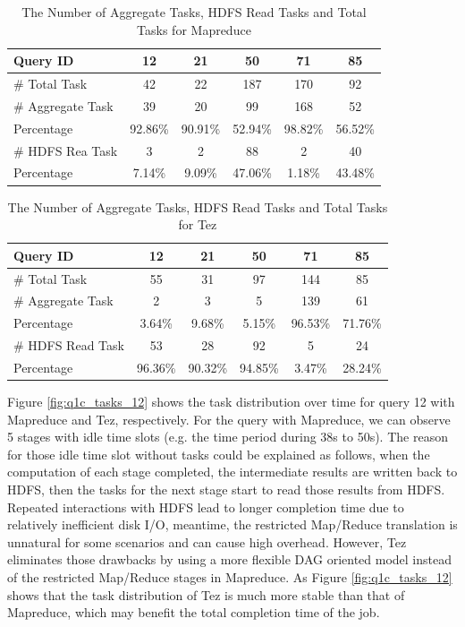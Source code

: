 \documentclass[10pt]{article}
\begin{document}
\begin{table}[htbp]
  \centering
  \caption{The Number of Aggregate Tasks, HDFS Read Tasks and Total Tasks for Mapreduce}
    \begin{tabular}{lccccc}
    \toprule
    Query ID & 12    & 21    & 50    & 71    & 85 \\
    \midrule
    \# Total Task & 42    & 22    & 187   & 170   & 92 \\
    \# Aggregate Task & 39    & 20    & 99    & 168   & 52 \\
    Percentage & 92.86\% & 90.91\% & 52.94\% & 98.82\% & 56.52\% \\
    \# HDFS Rea Task & 3     & 2     & 88    & 2     & 40 \\
    Percentage & 7.14\% & 9.09\% & 47.06\% & 1.18\% & 43.48\% \\
    \bottomrule
    \end{tabular}%
  \label{tab:mr_agg_task}%
\end{table}%

\begin{table}[htbp]
  \centering
  \caption{The Number of Aggregate Tasks, HDFS Read Tasks and Total Tasks for Tez}
    \begin{tabular}{lccccc}
    \toprule
    Query ID & 12    & 21    & 50    & 71    & 85 \\
    \midrule
    \# Total Task & 55    & 31    & 97    & 144   & 85 \\
    \# Aggregate Task & 2     & 3     & 5     & 139   & 61 \\
    Percentage & 3.64\% & 9.68\% & 5.15\% & 96.53\% & 71.76\% \\
    \# HDFS Read Task & 53    & 28    & 92    & 5     & 24 \\
    Percentage & 96.36\% & 90.32\% & 94.85\% & 3.47\% & 28.24\% \\

    \bottomrule
    \end{tabular}%
  \label{tab:tez_agg_task}%
\end{table}%


Figure \ref{fig:q1c_tasks_12} shows the task distribution over time for query 12 with Mapreduce and Tez, respectively. For the query with Mapreduce, we can observe 5 stages with idle time slots (e.g. the time period during 38s to 50s). The reason for those idle time slot without tasks could be explained as follows, when the computation of each stage completed, the intermediate results are written back to HDFS, then the tasks for the next stage start to read those results from HDFS. Repeated interactions with HDFS lead to longer completion time due to relatively inefficient disk I/O, meantime, the restricted Map/Reduce translation is unnatural for some scenarios and can cause high overhead. However, Tez eliminates those drawbacks by using a more flexible DAG oriented model instead of the restricted Map/Reduce stages in Mapreduce. As Figure \ref{fig:q1c_tasks_12} shows that the task distribution of Tez is much more stable than that of Mapreduce, which may benefit the total completion time of the job.
\end{document}
